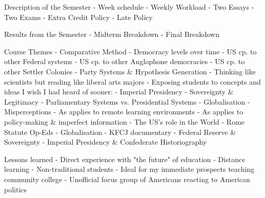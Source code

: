 Description of the Semester 
- Week schedule
- Weekly Workload
- Two Essays
- Two Exams
- Extra Credit Policy 
- Late Policy

Results from the Semester
- Midterm Breakdown
- Final Breakdown

Course Themes
- Comparative Method
    - Democracy levels over time
    - US cp. to other Federal systems
    - US cp. to other Anglophone democracies
    - US cp. to other Settler Colonies
- Party Systems \& Hypothesis Generation
    - Thinking like scientists but reading like liberal arts majors
    - Exposing students to concepts and ideas I wish I had heard of sooner:
        - Imperial Presidency
        - Sovereignty & Legitimacy
        - Parliamentary Systems vs. Presidential Systems
        - Globalisation 
- Misperceptions
    - As applies to remote learning environments
    - As applies to policy-making \& imperfect information
- The US's role in the World
    - Rome Statute Op-Eds
- Globalisation
    - KFCJ documentary 
    - Federal Reserve \& Sovereignty 
- Imperial Presidency \& Confederate Historiography

Lessons learned
- Direct experience with "the future" of education
    - Distance learning
    - Non-traditional students
    - Ideal for my immediate prospects teaching community college
- Unofficial focus group of Americans reacting to American politics
